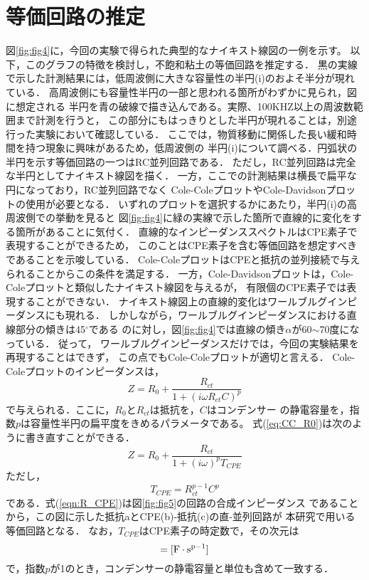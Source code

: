 \documentclass{jsce}
\begin{document}
\section{等価回路の推定}
図\ref{fig:fig4}に，今回の実験で得られた典型的なナイキスト線図の一例を示す。
以下，このグラフの特徴を検討し，不飽和粘土の等価回路を推定する．
黒の実線で示した計測結果には，低周波側に大きな容量性の半円(i)のおよそ半分が現れている．
高周波側にも容量性半円の一部と思われる箇所がわずかに見られ，図に想定される
半円を青の破線で描き込んである。実際、100KHZ以上の周波数範囲まで計測を行うと，
この部分にもはっきりとした半円が現れることは，別途行った実験において確認している．
ここでは，物質移動に関係した長い緩和時間を持つ現象に興味があるため，低周波側の
半円(i)について調べる．円弧状の半円を示す等価回路の一つはRC並列回路である．
ただし，RC並列回路は完全な半円としてナイキスト線図を描く．
一方，ここでの計測結果は横長で扁平な円になっており，RC並列回路でなく
Cole-ColeプロットやCole-Davidsonプロットの使用が必要となる．
いずれのプロットを選択するかにあたり，半円(i)の高周波側での挙動を見ると
図\ref{fig:fig4}に緑の実線で示した箇所で直線的に変化をする箇所があることに気付く．
直線的なインピーダンススペクトルはCPE素子で表現することができるため，
このことはCPE素子を含む等価回路を想定すべきであることを示唆している．
Cole-ColeプロットはCPEと抵抗の並列接続で与えられることからこの条件を満足する．
一方，Cole-Davidsonプロットは，Cole-Coleプロットと類似したナイキスト線図を与えるが，
有限個のCPE素子では表現することができない．
ナイキスト線図上の直線的変化はワールブルグインピーダンスにも現れる．
しかしながら，ワールブルグインピーダンスにおける直線部分の傾きは45$^\circ$である
のに対し，図\ref{fig:fig4}では直線の傾き$\alpha$が60$\sim$70度になっている．
従って， ワールブルグインピーダンスだけでは，今回の実験結果を再現することはできず，
この点でもCole-Coleプロットが適切と言える．
Cole-Coleプロットのインピーダンスは，
\begin{equation}
        Z=R_0 +\frac{R_{ct}}{1+\left( i\omega R_{ct}C\right)^p}
        \label{eqn:CC_R0}
\end{equation}
で与えられる．ここに，$R_0$と$R_{ct}$は抵抗を，$C$はコンデンサー
の静電容量を，指数$p$は容量性半円の扁平度をきめるパラメータである。
式(\ref{eq:CC_R0})は次のように書き直すことができる．
\begin{equation}
        Z=R_0 +\frac{R_{ct}}{1+\left( i\omega \right)^pT_{CPE}}
        \label{eqn:R_CPE}
\end{equation}
ただし，
\begin{equation}
        T_{CPE}=R_{ct}^{p-1}C^{p}
        \label{eqn:T_CPE}
\end{equation}
である．式(\ref{eqn:R_CPE})は図\ref{fig:fig5}の回路の合成インピーダンス
であることから，この図に示した抵抗aとCPE(b)-抵抗(c)の直-並列回路が
本研究で用いる等価回路となる．
なお，$T_{CPE}$はCPE素子の時定数で，その次元は
\begin{equation}
        [T_{CPE}] ={\rm [ F\cdot s^{p-1}]}
        \label{eqn:}
\end{equation}
で，指数$p$が1のとき，コンデンサーの静電容量と単位も含めて一致する．
\end{document}
